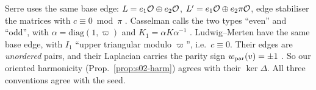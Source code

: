\begin{remark}\label{rem:s02-treeconv}
Serre uses the same base edge: $L=e_1\mathcal{O}\oplus e_2\mathcal{O}$, $L'=e_1\mathcal{O}\oplus e_2\pi\mathcal{O}$, edge stabiliser the
matrices with $c\equiv0\bmod\pi$ . Casselman calls the two types ``even'' and ``odd'', with $\alpha=\mathrm{diag}(1,\varpi)$ and
$K_1=\alpha K\alpha^{-1}$ .
Ludwig--Merten have the same base edge, with $I_1$ ``upper triangular modulo $\varpi$'', i.e.\ $c\equiv0$.
Their edges are \emph{unordered} pairs, and their Laplacian carries the parity sign $w_{\rm par}(v)=\pm1$
. So
our oriented harmonicity (Prop.~\ref{prop:s02-harm}) agrees with their $\ker\Delta$. All three conventions
agree with the seed. \stcited{} 
\end{remark}

